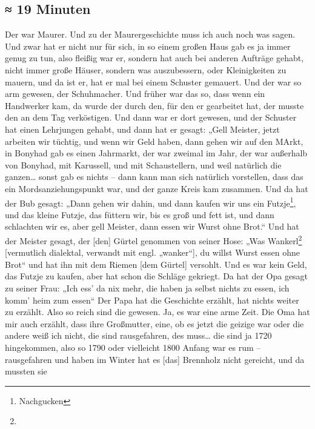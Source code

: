 \documentclass[ngerman,]{article}
\providecommand{\tightlist}{%
  \setlength{\itemsep}{0pt}\setlength{\parskip}{0pt}}
\begin{document}
\begin{multicols}{3}
\hypertarget{minuten-1}{%
\subsection{≈ 19 Minuten}\label{minuten-1}}

\begin{description}
\tightlist
\item[Käthe]
Der war Maurer. Und zu der Maurergeschichte muss ich auch noch was
sagen. Und zwar hat er nicht nur für sich, in so einem großen Haus gab
es ja immer genug zu tun, also fleißig war er, sondern hat auch bei
anderen Aufträge gehabt, nicht immer große Häuser, sondern was
auszubessern, oder Kleinigkeiten zu mauern, und da ist er, hat er mal
bei einem Schuster gemauert. Und der war so arm gewesen, der
Schuhmacher. Und früher war das so, dass wenn ein Handwerker kam, da
wurde der durch den, für den er gearbeitet hat, der musste den an dem
Tag verköstigen. Und dann war er dort gewesen, und der Schuster hat
einen Lehrjungen gehabt, und dann hat er gesagt: „Gell Meister, jetzt
arbeiten wir tüchtig, und wenn wir Geld haben, dann gehen wir auf den
MArkt, in Bonyhad gab es einen Jahrmarkt, der war zweimal im Jahr, der
war außerhalb von Bonyhad, mit Karussell, und mit Schaustellern, und
weil natürlich die ganzen\ldots{} sonst gab es nichts – dann kann man
sich natürlich vorstellen, dass das ein Mordsanziehungspunkt war, und
der ganze Kreis kam zusammen. Und da hat der Bub gesagt: „Dann gehen wir
dahin, und dann kaufen wir uns ein Futzje\footnote{Nachgucken}, und das
kleine Futzje, das füttern wir, bis es groß und fett ist, und dann
schlachten wir es, aber gell Meister, dann essen wir Wurst ohne Brot.“
Und hat der Meister gesagt, der {[}den{]} Gürtel genommen von seiner
Hose: „Was Wankerl\footnote{} {[}vermutlich dialektal, verwandt mit
engl. „wanker“{]}, du willst Wurst essen ohne Brot“ und hat ihn mit dem
Riemen {[}dem Gürtel{]} versohlt. Und es war kein Geld, das Futzje zu
kaufen, aber hat schon die Schläge gekriegt. Da hat der Opa gesagt zu
seiner Frau: „Ich ess' da nix mehr, die haben ja selbst nichts zu essen,
ich komm' heim zum essen“ Der Papa hat die Geschichte erzählt, hat
nichts weiter zu erzählt. Also so reich sind die gewesen. Ja, es war
eine arme Zeit. Die Oma hat mir auch erzählt, dass ihre Großmutter,
eine, ob es jetzt die geizige war oder die andere weiß ich nicht, die
sind rausgefahren, des muss\ldots{} die sind ja 1720 hingekommen, also
so 1790 oder vielleicht 1800 Anfang war es rum – rausgefahren und haben
im Winter hat es {[}das{]} Brennholz nicht gereicht, und da mussten sie

\end{description}
\end{multicols}
\end{document}
